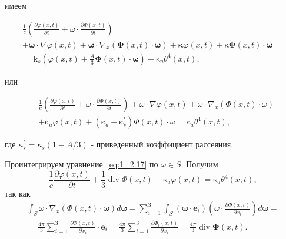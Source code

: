 имеем

\begin{gather*}
    \frac{1}{c}\left(\frac{\partial \varphi(x, t)}{\partial t}
    + \omega \cdot \frac{\partial \Phi(x, t)}{\partial t}\right) \\
    + \boldsymbol{\omega} \cdot \nabla \varphi(x, t)
    + \boldsymbol{\omega} \cdot \nabla_{x}
    (\boldsymbol{\Phi}(x, t) \cdot \boldsymbol{\omega})
    + \boldsymbol{\kappa} \varphi(x, t)+\mathrm{\kappa}
    \boldsymbol{\Phi}(x, t) \cdot \boldsymbol{\omega} = \\
    = \mathrm{k}_{s}\left(\varphi(x, t)+\frac{A}{3} \boldsymbol{\Phi}(x, t) \cdot
    \boldsymbol{\omega}\right)+\mathrm{\kappa}_{a} \theta^{4}(x, t),
\end{gather*}

или

\begin{equation}
    \label{eq:1_2:17}
    \begin{aligned}
        &\frac{1}{c}\left(\frac{\partial \varphi(x, t)}{\partial t}
        + \omega \cdot \frac{\partial \Phi(x, t)}{\partial t}\right)
        + \omega \cdot \nabla \varphi(x, t)
        + \omega \cdot \nabla_{x}(\Phi(x, t) \cdot \omega) \\
        &+ \mathrm{\kappa}_{a} \varphi(x, t)+\left(\mathrm{\kappa}_{a}
        + \mathrm{\kappa}_{s}^{\prime}\right)
        \Phi(x, t) \cdot \omega = \mathrm{\kappa}_{a} \theta^{4}(x, t),
    \end{aligned}
\end{equation}

где $\kappa_{s}^{\prime}=\kappa_{s}(1-A / 3)$ - приведенный коэффициент рассеяния.


Проинтегрируем уравнение~\eqref{eq:1_2:17} по $\omega \in S$.
Получим
\begin{equation}
    \label{eq:1_2:18}
    \frac{1}{c} \frac{\partial \varphi(x, t)}{\partial t}
    + \frac{1}{3} \operatorname{div} \Phi(x, t)
    + \mathrm{\kappa}_{a} \varphi(x, t)
    = \mathrm{\kappa}_{a} \theta^{4}(x, t),
\end{equation}
так как
\[
    \begin{gathered}
        \int_{S} \omega \cdot \nabla_{x}(\Phi(x, t)
        \cdot \boldsymbol{\omega}) d \boldsymbol{\omega}=\sum_{i=1}^{3}
        \int_{S}\left(\boldsymbol{\omega}
        \cdot \mathbf{e}_{i}\right)\left(\omega \cdot
        \frac{\partial \Phi(x, t)}{\partial x_{i}}\right) d \boldsymbol{\omega} = \\
        = \frac{4 \pi}{3} \sum_{i=1}^{3} \frac{\partial \Phi(x, t)}{\partial x_{i}} \cdot
        \mathbf{e}_{i}=\frac{4 \pi}{3} \sum_{i=1}^{3}
        \frac{\partial \Phi_{i}(x, t)}{\partial x_{i}}=
        \frac{4 \pi}{3} \operatorname{div} \boldsymbol{\Phi}(x, t).
    \end{gathered}
\]


